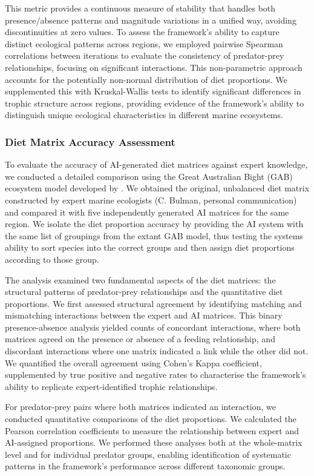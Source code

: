 This metric provides a continuous measure of stability that handles both presence/absence patterns and magnitude variations in a unified way, avoiding discontinuities at zero values. To assess the framework's ability to capture distinct ecological patterns across regions, we employed pairwise Spearman correlations between iterations to evaluate the consistency of predator-prey relationships, focusing on significant interactions. This non-parametric approach accounts for the potentially non-normal distribution of diet proportions. We supplemented this with Kruskal-Wallis tests to identify significant differences in trophic structure across regions, providing evidence of the framework's ability to distinguish unique ecological characteristics in different marine ecosystems.

\subsubsection{Diet Matrix Accuracy Assessment}
\label{sec:accuracy_assessment}
To evaluate the accuracy of AI-generated diet matrices against expert knowledge, we conducted a detailed comparison using the Great Australian Bight (GAB) ecosystem model developed by \citet{Fulton2018}. We obtained the original, unbalanced diet matrix constructed by expert marine ecologists (C. Bulman, personal communication) and compared it with five independently generated AI matrices for the same region. We isolate the diet proportion accuracy by providing the AI system with the same list of groupings from the extant GAB model, thus testing the systems ability to sort species into the correct groups and then assign diet proportions according to those group. 

The analysis examined two fundamental aspects of the diet matrices: the structural patterns of predator-prey relationships and the quantitative diet proportions. We first assessed structural agreement by identifying matching and mismatching interactions between the expert and AI matrices. This binary presence-absence analysis yielded counts of concordant interactions, where both matrices agreed on the presence or absence of a feeding relationship, and discordant interactions where one matrix indicated a link while the other did not. We quantified the overall agreement using Cohen's Kappa coefficient, supplemented by true positive and negative rates to characterise the framework's ability to replicate expert-identified trophic relationships.

For predator-prey pairs where both matrices indicated an interaction, we conducted quantitative comparisons of the diet proportions. We calculated the Pearson correlation coefficients to measure the relationship between expert and AI-assigned proportions. We performed these analyses both at the whole-matrix level and for individual predator groups, enabling identification of systematic patterns in the framework's performance across different taxonomic groups.
